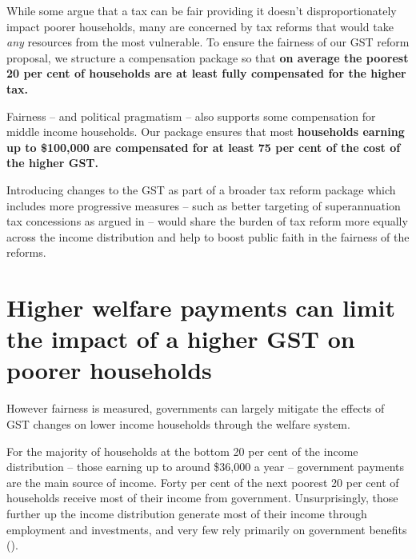 While some argue that a tax can be fair providing it doesn’t disproportionately impact poorer households, many are concerned by tax reforms that would take \emph{any} resources from the most vulnerable. To ensure the fairness of our GST reform proposal, we structure a compensation package so that \textbf{on average the poorest 20 per cent of households are at least fully compensated for the higher tax.} 

Fairness – and political pragmatism – also supports some compensation for middle income households. Our package ensures that most \textbf{households earning up to \$100,000 are compensated for at least 75 per cent of the cost of the higher GST.}

Introducing changes to the GST as part of a broader tax reform package which includes more progressive measures – such as better targeting of superannuation tax concessions as argued in  – would share the burden of tax reform more equally across the income distribution and help to boost public faith in the fairness of the reforms. 

\section{Higher welfare payments can limit the impact of a higher GST on poorer households}\label{sec:GST-3-2}
However fairness is measured, governments can largely mitigate the effects of GST changes on lower income households through the welfare system.

For the majority of households at the bottom 20 per cent of the income distribution – those earning up to around \$36,000 a year  – government payments are the main source of income. Forty per cent of the next poorest 20 per cent of households receive most of their income from government. Unsurprisingly, those further up the income distribution generate most of their income through employment and investments, and very few rely primarily on government benefits (). %

